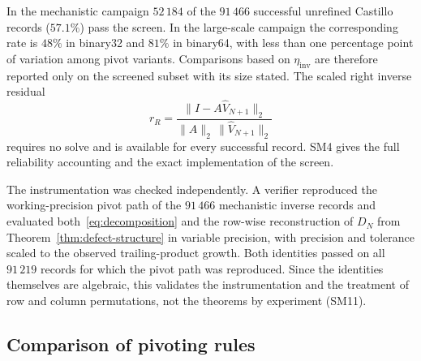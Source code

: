 \documentclass[review,onefignum,onetabnum]{siamart251216}
\begin{document}
In the mechanistic campaign $52\,184$ of the $91\,466$ successful unrefined Castillo records
($57.1\%$) pass the screen. In the large-scale campaign the corresponding rate is $48\%$ in
binary32 and $81\%$ in binary64, with less than one percentage point of variation among pivot
variants. Comparisons based on $\eta_{\mathrm{inv}}$ are therefore reported only on the screened
subset with its size stated. The scaled right inverse residual
%
\begin{equation}\label{eq:rinv}
r_R
=
\frac{\|I-A\widehat V_{N+1}\|_2}{\|A\|_2\,\|\widehat V_{N+1}\|_2}
\end{equation}
%
requires no solve and is available for every successful record. SM4 gives the full reliability
accounting and the exact implementation of the screen.

The instrumentation was checked independently. A verifier reproduced the working-precision pivot
path of the $91\,466$ mechanistic inverse records and evaluated both~\eqref{eq:decomposition} and
the row-wise reconstruction of $D_N$ from Theorem~\ref{thm:defect-structure} in variable precision,
with precision and tolerance scaled to the observed trailing-product growth. Both identities passed
on all $91\,219$ records for which the pivot path was reproduced. Since the identities themselves
are algebraic, this validates the instrumentation and the treatment of row and column permutations,
not the theorems by experiment (SM11).

\subsection{Comparison of pivoting rules}
\label{sec:comparison}
\end{document}
